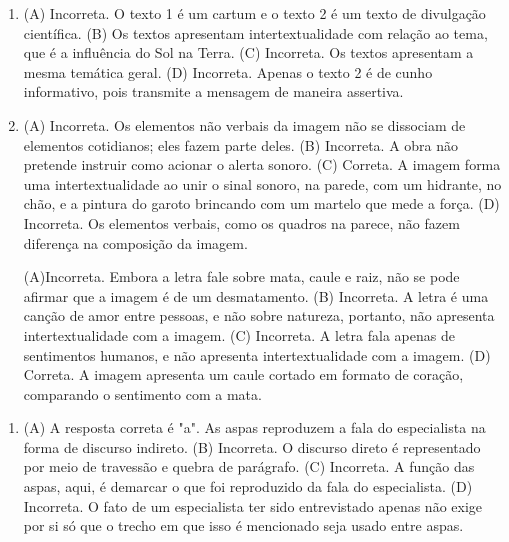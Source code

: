 \begin{enumerate}
\item (A) Incorreta. O texto 1 é um cartum e o texto 2 é um texto de divulgação
científica.
(B) Os textos apresentam intertextualidade com relação ao tema, que é a
influência do Sol na Terra.
(C) Incorreta. Os textos apresentam a mesma temática geral.
(D) Incorreta. Apenas o texto 2 é de cunho informativo, pois transmite a
mensagem de maneira assertiva.

\item (A) Incorreta. Os elementos não verbais da imagem não se dissociam de
elementos cotidianos; eles fazem parte deles.
(B) Incorreta. A obra não pretende instruir como acionar o alerta sonoro.
(C) Correta. A imagem forma uma intertextualidade ao unir o sinal sonoro,
na parede, com um hidrante, no chão, e a pintura do garoto brincando com
um martelo que mede a força.
(D) Incorreta. Os elementos verbais, como os quadros na parece, não fazem
diferença na composição da imagem.

(A)Incorreta. Embora a letra fale sobre mata, caule e raiz, não se pode
afirmar que a imagem é de um desmatamento.
(B) Incorreta. A letra é uma canção de amor entre pessoas, e não sobre
natureza, portanto, não apresenta intertextualidade com a imagem.
(C) Incorreta. A letra fala apenas de sentimentos humanos, e não
apresenta intertextualidade com a imagem.
(D) Correta. A imagem apresenta um caule cortado em formato de coração,
comparando o sentimento com a mata.
\end{enumerate}


\begin{enumerate}
\item (A) A resposta correta é "a". As aspas reproduzem a fala do especialista na forma de discurso indireto.
(B)  Incorreta. O discurso direto é representado por meio de travessão e
quebra de parágrafo.
(C)  Incorreta. A função das aspas, aqui, é demarcar o que foi
reproduzido da fala do especialista.
(D)  Incorreta. O fato de um especialista ter sido entrevistado apenas
não exige por si só que o trecho em que isso é mencionado seja usado
entre aspas.
\end{enumerate}


